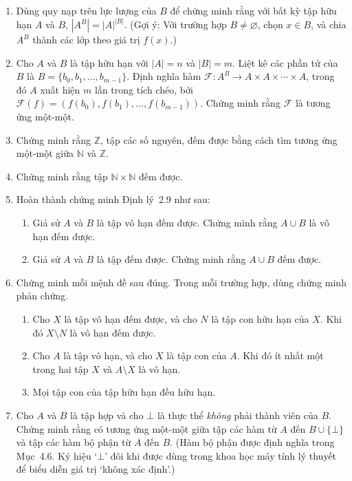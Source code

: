 \begin{enumerate}
\item[7.] Dùng quy nạp trên lực lượng của $B$ để chứng minh rằng với bất kỳ tập hữu hạn $A$ và $B$, $|A^B| = |A|^{|B|}$. (Gợi ý: Với trường hợp $B \neq \varnothing$, chọn $x \in B$, và chia $A^B$ thành các lớp theo giá trị $f(x)$.)

\item[8.] Cho $A$ và $B$ là tập hữu hạn với $|A| = n$ và $|B| = m$. Liệt kê các phần tử của $B$ là $B = \{b_0, b_1, \ldots, b_{m-1}\}$. Định nghĩa hàm $\mathcal{F}\colon A^B \to A \times A \times \cdots \times A$, trong đó $A$ xuất hiện $m$ lần trong tích chéo, bởi $\mathcal{F}(f) = (f(b_0), f(b_1), \ldots, f(b_{m-1}))$. Chứng minh rằng $\mathcal{F}$ là tương ứng một-một.

\item[9.] Chứng minh rằng $\mathbb{Z}$, tập các số nguyên, đếm được bằng cách tìm tương ứng một-một giữa $\mathbb{N}$ và $\mathbb{Z}$.

\item[10.] Chứng minh rằng tập $\mathbb{N} \times \mathbb{N}$ đếm được.

\item[11.] Hoàn thành chứng minh Định lý~2.9 như sau:
\begin{enumerate}[label=\alph*)]
\item Giả sử $A$ và $B$ là tập vô hạn đếm được. Chứng minh rằng $A \cup B$ là vô hạn đếm được.
\item Giả sử $A$ và $B$ là tập đếm được. Chứng minh rằng $A \cup B$ đếm được.
\end{enumerate}

\item[12.] Chứng minh mỗi mệnh đề sau đúng. Trong mỗi trường hợp, dùng chứng minh phản chứng.
\begin{enumerate}[label=\alph*)]
\item Cho $X$ là tập vô hạn đếm được, và cho $N$ là tập con hữu hạn của $X$. Khi đó $X \setminus N$ là vô hạn đếm được.
\item Cho $A$ là tập vô hạn, và cho $X$ là tập con của $A$. Khi đó ít nhất một trong hai tập $X$ và $A \setminus X$ là vô hạn.
\item Mọi tập con của tập hữu hạn đều hữu hạn.
\end{enumerate}

\item[13.] Cho $A$ và $B$ là tập hợp và cho $\bot$ là thực thể \emph{không} phải thành viên của $B$. Chứng minh rằng có tương ứng một-một giữa tập các hàm từ $A$ đến $B \cup \{\bot\}$ và tập các hàm bộ phận từ $A$ đến $B$. (Hàm bộ phận được định nghĩa trong Mục~4.6. Ký hiệu `$\bot$' đôi khi được dùng trong khoa học máy tính lý thuyết để biểu diễn giá trị `không xác định'.)
\end{enumerate}


